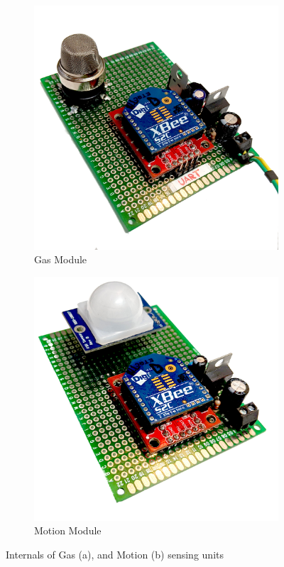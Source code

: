	\begin{figure}[h!]
		\centering
		\begin{subfigure}[t]{0.45\textwidth}
			\centering
			\includegraphics[width=\linewidth]{module_gas.jpg}
			\caption{Gas Module}
		\end{subfigure}
		\begin{subfigure}[t]{0.45\textwidth}
			\centering
			\includegraphics[width=\linewidth]{module_motion.jpg}
			\caption{Motion Module}
		\end{subfigure}
		\caption{Internals of Gas (a), and Motion (b) sensing units}
	\end{figure}
